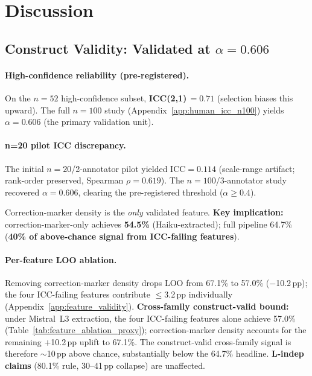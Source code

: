 \section{Discussion}
\label{sec:discussion}

\subsection{Construct Validity: Validated at $\alpha=0.606$}
\label{sec:icc_caveat}
\label{sec:icc_owned}

\paragraph{High-confidence reliability (pre-registered).}
On the $n\!=\!52$ high-confidence subset, \textbf{ICC(2,1)\,$=\!0.71$} (selection biases this upward). The full $n\!=\!100$ study (Appendix~\ref{app:human_icc_n100}) yields $\alpha\!=\!0.606$ (the primary validation unit).

\paragraph{n=20 pilot ICC discrepancy.} The initial $n\!=\!20$/2-annotator pilot yielded ICC$\!=\!0.114$ (scale-range artifact; rank-order preserved, Spearman $\rho\!=\!0.619$). The $n\!=\!100$/3-annotator study recovered $\alpha\!=\!0.606$, clearing the pre-registered threshold ($\alpha\!\geq\!0.4$).

Correction-marker density is the \emph{only} validated feature. \textbf{Key implication:} correction-marker-only achieves \textbf{54.5\%} (Haiku-extracted); full pipeline 64.7\% (\textbf{40\% of above-chance signal from ICC-failing features}).

\paragraph{Per-feature LOO ablation.}
Removing correction-marker density drops LOO from 67.1\% to 57.0\% ($-$10.2\,pp); the four ICC-failing features contribute $\leq$3.2\,pp individually (Appendix~\ref{app:feature_validity}). \textbf{Cross-family construct-valid bound:} under Mistral~L3 extraction, the four ICC-failing features alone achieve 57.0\% (Table~\ref{tab:feature_ablation_proxy}); correction-marker density accounts for the remaining $+$10.2\,pp uplift to 67.1\%. The construct-valid cross-family signal is therefore $\sim$10\,pp above chance, substantially below the 64.7\% headline. \textbf{L-indep claims} (80.1\% rule, 30--41\,pp collapse) are unaffected.

